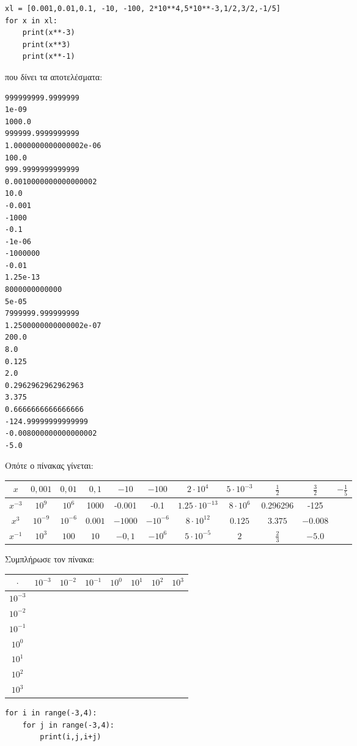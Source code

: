 \begin{lstlisting}
xl = [0.001,0.01,0.1, -10, -100, 2*10**4,5*10**-3,1/2,3/2,-1/5]
for x in xl:
    print(x**-3)
    print(x**3)
    print(x**-1)
\end{lstlisting}
που δίνει τα αποτελέσματα:
\begin{lstlisting}
999999999.9999999
1e-09
1000.0
999999.9999999999
1.0000000000000002e-06
100.0
999.9999999999999
0.0010000000000000002
10.0
-0.001
-1000
-0.1
-1e-06
-1000000
-0.01
1.25e-13
8000000000000
5e-05
7999999.999999999
1.2500000000000002e-07
200.0
8.0
0.125
2.0
0.2962962962962963
3.375
0.6666666666666666
-124.99999999999999
-0.008000000000000002
-5.0
\end{lstlisting}
Οπότε ο πίνακας γίνεται:
\begin{table}[ht]
\begin{tabular}{|c|c|c|c|c|c|c|c|c|c|c|}
\hline
$x$        &$0,001$&$0,01$&$0,1$&$ -10$&$ -100$&$ 2\cdot 10^4$& $5\cdot 10^{-3}$&$\frac{1}{2}$&$\frac{3}{2}$&$-\frac{1}{5}$\\\hline
$x^{-3}$ &$10^9$&$10^6$&1000&-0.001&-0.1&$1.25\cdot 10^{-13}$&$8\cdot 10^6$&0.296296&-125\\\hline
$x^3$ &$10^{-9}$&$10^{-6}$&$0.001$&$-1000$&$-10^{-6}$&$8\cdot 10^{12}$&$0.125$&$3.375$&$-0.008$&\\\hline
$x^{-1}$ &$10^3$&$100$&$10$&$-0,1$&$-10^6$&$5\cdot 10^{-5}$&$2$&$\frac{2}{3}$&$-5.0$\\\hline
\end{tabular}
\end{table}
\begin{exercise}
Συμπλήρωσε τον πίνακα:
\begin{table}[ht]
\begin{tabular}{|c|c|c|c|c|c|c|c|}
$\cdot$&$10^{-3}$&$10^{-2}$&$10^{-1}$&$10^0$&$10^1$&$10^2$&$10^3$\\\hline
$10^{-3}$&&&&&&&\\\hline
$10^{-2}$&&&&&&&\\\hline
$10^{-1}$&&&&&&&\\\hline
$10^{0}$&&&&&&&\\\hline
$10^{1}$&&&&&&&\\\hline
$10^{2}$&&&&&&&\\\hline
$10^{3}$&&&&&&&\\\hline
\end{tabular}
\end{table}
\end{exercise}
\begin{lstlisting}
for i in range(-3,4):
    for j in range(-3,4):
        print(i,j,i+j)
\end{lstlisting}
